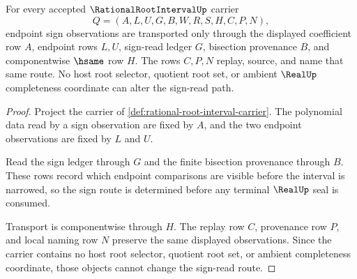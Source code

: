 \begin{theorem}
\label{thm:rational-root-interval-sign-read-stability}
For every accepted $\RationalRootIntervalUp$ carrier
$$
Q=(A,L,U,G,B,W,R,S,H,C,P,N),
$$
endpoint sign observations are transported only through the displayed coefficient row $A$, endpoint rows $L,U$, sign-read ledger $G$, bisection provenance $B$, and componentwise $\hsame$ row $H$. The rows $C,P,N$ replay, source, and name that same route. No host root selector, quotient root set, or ambient $\RealUp$ completeness coordinate can alter the sign-read path.
\end{theorem}
\begin{proof}
Project the carrier of \autoref{def:rational-root-interval-carrier}. The polynomial data read by a sign observation are fixed by $A$, and the two endpoint observations are fixed by $L$ and $U$.

Read the sign ledger through $G$ and the finite bisection provenance through $B$. These rows record which endpoint comparisons are visible before the interval is narrowed, so the sign route is determined before any terminal $\RealUp$ seal is consumed.

Transport is componentwise through $H$. The replay row $C$, provenance row $P$, and local naming row $N$ preserve the same displayed observations. Since the carrier contains no host root selector, quotient root set, or ambient completeness coordinate, those objects cannot change the sign-read route.
\end{proof}


\begin{closurestatus}{\RationalRootIntervalUp}
  \theoryclosure{\seedClosure}
  \formalstatus{\unformalizedV}
\end{closurestatus}
